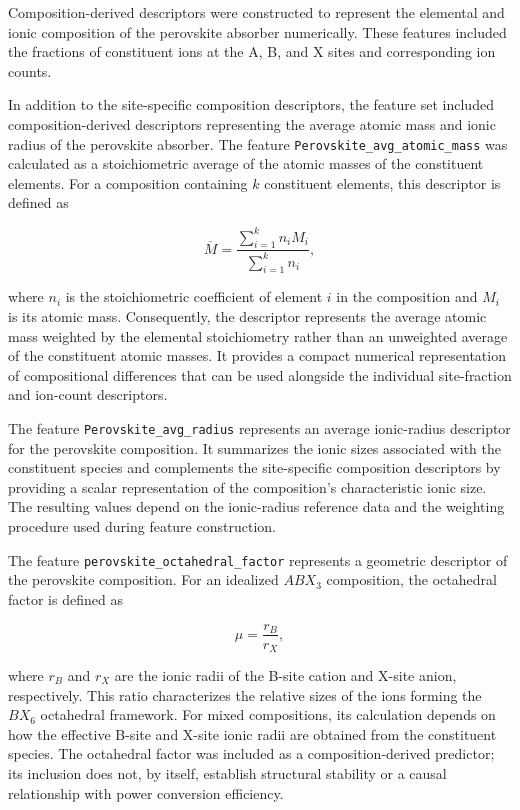 \documentclass[3p]{elsarticle}
\begin{document}
Composition-derived descriptors were constructed to represent the elemental and ionic composition of the perovskite absorber numerically. These features included the fractions of constituent ions at the A, B, and X sites and corresponding ion counts.

In addition to the site-specific composition descriptors, the feature set included composition-derived descriptors representing the average atomic mass and ionic radius of the perovskite absorber. The feature \texttt{Perovskite\_avg\_atomic\_mass} was calculated as a stoichiometric average of the atomic masses of the constituent elements. For a composition containing \(k\) constituent elements, this descriptor is defined as

\[
\overline{M}=\frac{\sum_{i=1}^{k} n_i M_i}{\sum_{i=1}^{k} n_i},
\]

where \(n_i\) is the stoichiometric coefficient of element \(i\) in the composition and \(M_i\) is its atomic mass. Consequently, the descriptor represents the average atomic mass weighted by the elemental stoichiometry rather than an unweighted average of the constituent atomic masses. It provides a compact numerical representation of compositional differences that can be used alongside the individual site-fraction and ion-count descriptors.

The feature \texttt{Perovskite\_avg\_radius} represents an average ionic-radius descriptor for the perovskite composition. It summarizes the ionic sizes associated with the constituent species and complements the site-specific composition descriptors by providing a scalar representation of the composition's characteristic ionic size. The resulting values depend on the ionic-radius reference data and the weighting procedure used during feature construction.

The feature \texttt{perovskite\_octahedral\_factor} represents a geometric descriptor of the perovskite composition. For an idealized \(ABX_3\) composition, the octahedral factor is defined as

\[
\mu=\frac{r_B}{r_X},
\]

where \(r_B\) and \(r_X\) are the ionic radii of the B-site cation and X-site anion, respectively. This ratio characterizes the relative sizes of the ions forming the \(BX_6\) octahedral framework. For mixed compositions, its calculation depends on how the effective B-site and X-site ionic radii are obtained from the constituent species. The octahedral factor was included as a composition-derived predictor; its inclusion does not, by itself, establish structural stability or a causal relationship with power conversion efficiency.
\end{document}
